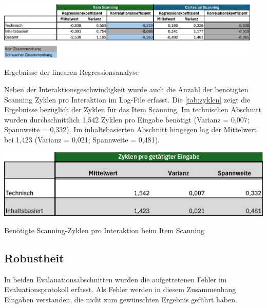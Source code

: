 \begin{table}[tbh]
    \centering
    \includegraphics[width=0.95\textwidth]{images/Results/Regressionskoeffizienten-Korrelation-Table-Lernkurve-Geschwindigkeit.png}
    \caption{Ergebnisse der linearen Regressionsanalyse}
    \label{tab:RegressionskoeffizientenTable}
\end{table}

Neben der Interaktionsgeschwindigkeit wurde auch die Anzahl der benötigten Scanning Zyklen pro Interaktion im Log-File erfasst. Die \autoref{tab:zyklen} zeigt die Ergebnisse bezüglich der Zyklen für das Item Scanning. Im technischen Abschnitt wurden durchschnittlich 1,542 Zyklen pro Eingabe benötigt (Varianz = 0,007; Spannweite = 0,332). Im inhaltsbasierten Abschnitt hingegen lag der Mittelwert bei 1,423 (Varianz = 0,021; Spannweite = 0,481).


\begin{table}[tbh]
    \centering
    \includegraphics{images/Results/Zyklen-Item.png}
    \caption{Benötigte Scanning-Zyklen pro Interaktion beim Item Scanning}
    \label{tab:zyklen}
\end{table}

\subsection{Robustheit}

In beiden Evalauationsabschnitten wurden die aufgetretenen Fehler im Evaluationsprotokoll erfasst. Als Fehler werden in diesem Zusammenhang Eingaben verstanden, die nicht zum gewünschten Ergebnis geführt haben. 

